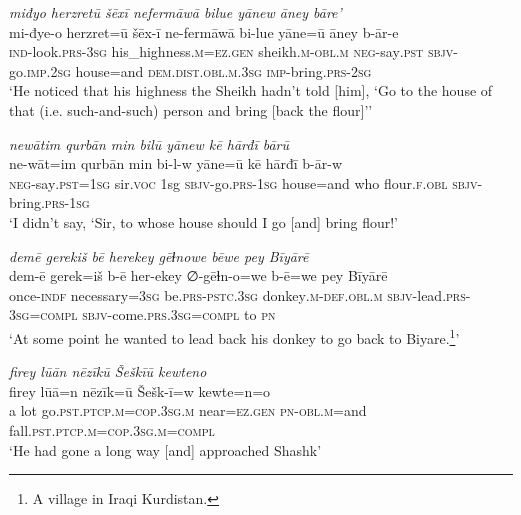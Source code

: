 \ea \label{HB.17}
\textit{miđyo herzretū šēxī nefermāwā bilue yānew āney bāre’} \\ 
\gll mi-đye-o herzret=ū šēx-ī ne-fermāwā bi-lue yāne=ū āney b-ār-e \\ 
 \textsc{ind-}look\textsc{.prs}\textsc{-3sg} his\_highness\textsc{.m}\textsc{=ez}\textsc{.gen} sheikh\textsc{.m}\textsc{-obl}\textsc{.m} \textsc{neg-}say\textsc{.pst} \textsc{sbjv-}go\textsc{.imp}\textsc{.\textsc{2sg}} house=and \textsc{dem.dist}\textsc{.obl}\textsc{.m}\textsc{.3sg} \textsc{imp-}bring\textsc{.prs}-\textsc{2sg} \\ 
\glt `He noticed that his highness the Sheikh hadn’t told [him], ‘Go to the house of that (i.e. such-and-such) person and bring [back the flour]’'
\z 
 
\ea \label{HB.20}
\textit{newātim qurbān min bilū yānew kē hārđī bārū} \\ 
\gll ne-wāt=im qurbān min bi-l-w yāne=ū kē hārđī b-ār-w \\ 
 \textsc{neg-}say\textsc{.pst}\textsc{=1sg} sir.\textsc{voc} 1sg \textsc{sbjv-}go\textsc{.prs}\textsc{-1sg} house=and who flour\textsc{\textsc{.f}}\textsc{.obl} \textsc{sbjv-}bring\textsc{.prs}\textsc{-1sg} \\ 
\glt `I didn’t say, ‘Sir, to whose house should I go [and] bring flour!'
\z 
 
\ea \label{HB.25}
\textit{demē gerekiš bē herekey gēɫnowe bēwe pey Bīyārē} \\ 
\gll dem-ē gerek=iš b-ē her-ekey ∅-gēɫn-o=we b-ē=we pey Bīyārē \\ 
 once\textsc{-indf} necessary\textsc{=3sg} be\textsc{.prs}\textsc{-pstc}\textsc{.3sg} donkey\textsc{.m}\textsc{-def}\textsc{.obl}\textsc{.m} \textsc{sbjv-}lead\textsc{.prs}\textsc{-3sg}\textsc{=\textsc{compl}} \textsc{sbjv-}come\textsc{.prs}\textsc{.3sg}\textsc{=\textsc{compl}} to \textsc{pn} \\ 
\glt `At some point he wanted to lead back his donkey to go back to Biyare.\footnote{A village in Iraqi Kurdistan.}'
\z 
 
\ea \label{HB.30}
\textit{firey lūān nēzīkū Šeškīū kewteno} \\ 
\gll firey lūā=n nēzīk=ū Šešk-ī=w kewte=n=o \\ 
 a lot go\textsc{.pst}\textsc{.ptcp}\textsc{.m}\textsc{=cop}\textsc{.3sg}\textsc{.m} near\textsc{=ez}\textsc{.gen} \textsc{pn}\textsc{-obl}\textsc{.m}=and fall\textsc{.pst}\textsc{.ptcp}\textsc{.m}\textsc{=cop}\textsc{.3sg}\textsc{.m}\textsc{=\textsc{compl}} \\ 
\glt `He had gone a long way [and] approached Shashk'
\z 
 
